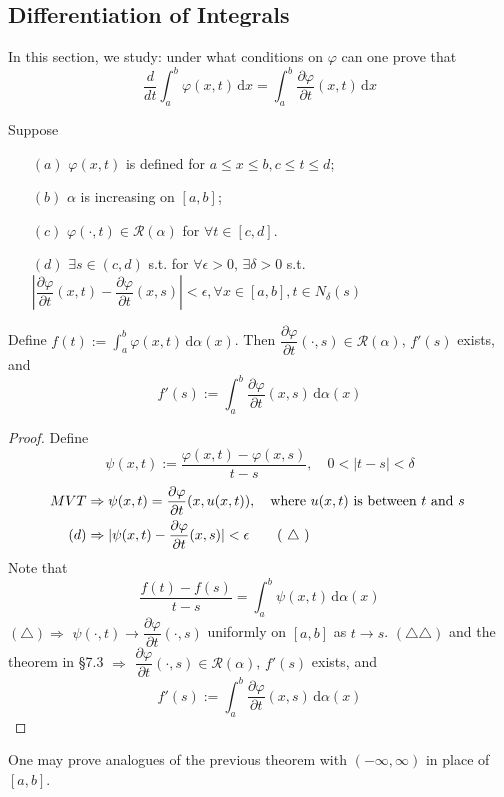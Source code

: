 \subsection{Differentiation of Integrals}
In this section, we study: under what conditions on  $ \varphi $ can one prove that 
\[\dfrac{d}{dt}\int_{a }^{ b } \varphi(x,t )\, \mathrm{d}x =\int_{a }^{b } \dfrac{\partial \varphi }{\partial t }(x,t)\, \mathrm{d}x   \] 
\begin{theorem}
    Suppose 
    \begin{enumerate}
        \item[$ (a) $]  $ \varphi(x,t) $ is defined for  $ a \leqslant x \leqslant b,c \leqslant t \leqslant d $;
        \item[$ (b) $]  $ \alpha $ is increasing on  $ [a,b] $;
        \item[$ (c) $] $ \varphi(\cdot,t )\in \mathscr{R}(\alpha) $ for  $ \forall t\in [c,d] $.
        \item[$ (d) $]  $\exists s\in(c,d)$ s.t.  for  $ \forall \epsilon>0,\,\exists \delta>0 $ s.t. $ |\dfrac{\partial \varphi }{\partial t}(x,t)-\dfrac{\partial \varphi }{\partial t}(x,s)|<\epsilon,\forall x\in [a,b],t\in N_\delta(s) $   
    \end{enumerate}
    Define  $ f(t):=\int_{a }^{b } \varphi(x,t)\, \mathrm{d}\alpha(x)  $.
    Then  $ \dfrac{\partial \varphi }{\partial t}(\cdot,s)\in \mathscr{R}(\alpha)  $,  $ f'(s ) $ exists, and 
    \[f'(s):=\int_{a }^{b } \dfrac{\partial \varphi }{\partial t}(x,s)\, \mathrm{d}\alpha(x)  \] 
\end{theorem}
\begin{proof}
    
    Define\[\psi (x,t):=\dfrac{\varphi(x,t)-\varphi(x,s)}{t-s},\quad0<|t-s|<\delta\]
    \begin{align*}
        MVT&\Rightarrow \psi(x,t)=\dfrac{\partial \varphi }{\partial t }(x,u(x,t)),\quad\text{where  $ u(x,t)  $ is between  $ t  $ and  $ s $ }\\
        (d)&\Rightarrow|\psi(x,t)-\dfrac{\partial \varphi }{\partial t}(x,s)|<\epsilon\tag{ $ \triangle $ }
    \end{align*}
    Note that \[\dfrac{f(t)-f(s)}{t-s}=\int_{a }^{b } \psi(x,t)\, \mathrm{d}\alpha(x) \tag{ $ \triangle\triangle $ } \]
     $ (\triangle)\Rightarrow  $  $ \psi(\cdot,t)\rightarrow\dfrac{\partial \varphi }{\partial t}(\cdot,s) $ uniformly on  $ [a,b] $ as  $ t\rightarrow s $.
      $ (\triangle\triangle ) $ and the theorem in  \S{7.3}  $ \Rightarrow  $  $ \dfrac{\partial \varphi }{\partial t}(\cdot,s)\in \mathscr{R}(\alpha) $, $ f'(s ) $ exists, and 
      \[f'(s):=\int_{a }^{b } \dfrac{\partial \varphi }{\partial t}(x,s)\, \mathrm{d}\alpha(x)  \]     
\end{proof}
\begin{remark}
    One may prove analogues of the previous theorem with  $ (-\infty,\infty) $ in place of  $ [a,b] $. 
\end{remark}